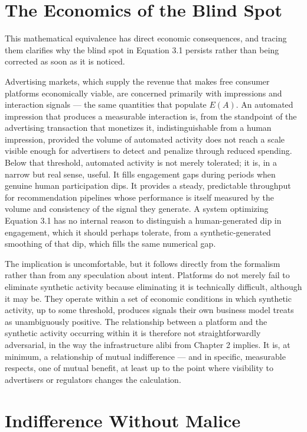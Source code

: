\documentclass[12pt,a4paper]{book}
\begin{document}
\section{The Economics of the Blind Spot}

This mathematical equivalence has direct economic consequences, and tracing them clarifies why the blind spot in Equation 3.1 persists rather than being corrected as soon as it is noticed.

Advertising markets, which supply the revenue that makes free consumer platforms economically viable, are concerned primarily with impressions and interaction signals — the same quantities that populate $E(A)$. An automated impression that produces a measurable interaction is, from the standpoint of the advertising transaction that monetizes it, indistinguishable from a human impression, provided the volume of automated activity does not reach a scale visible enough for advertisers to detect and penalize through reduced spending. Below that threshold, automated activity is not merely tolerated; it is, in a narrow but real sense, useful. It fills engagement gaps during periods when genuine human participation dips. It provides a steady, predictable throughput for recommendation pipelines whose performance is itself measured by the volume and consistency of the signal they generate. A system optimizing Equation 3.1 has no internal reason to distinguish a human-generated dip in engagement, which it should perhaps tolerate, from a synthetic-generated smoothing of that dip, which fills the same numerical gap.

The implication is uncomfortable, but it follows directly from the formalism rather than from any speculation about intent. Platforms do not merely fail to eliminate synthetic activity because eliminating it is technically difficult, although it may be. They operate within a set of economic conditions in which synthetic activity, up to some threshold, produces signals their own business model treats as unambiguously positive. The relationship between a platform and the synthetic activity occurring within it is therefore not straightforwardly adversarial, in the way the infrastructure alibi from Chapter 2 implies. It is, at minimum, a relationship of mutual indifference — and in specific, measurable respects, one of mutual benefit, at least up to the point where visibility to advertisers or regulators changes the calculation.

\section{Indifference Without Malice}
\end{document}

